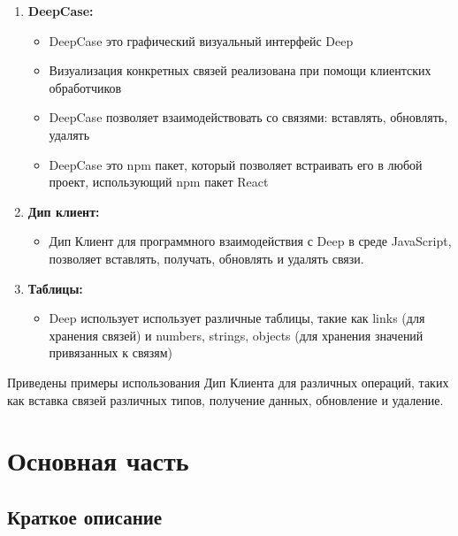 \documentclass{article}
\begin{document}
\begin{enumerate}
  \item \textbf{DeepCase:}
        \begin{itemize}
          \item DeepCase это графический визуальный интерфейс Deep
          \item Визуализация конкретных связей реализована при помощи клиентских обработчиков
          \item DeepCase позволяет взаимодействовать со связями: вставлять,
                обновлять, удалять
          \item DeepCase это npm пакет, который позволяет встраивать его в любой проект, использующий npm пакет React
        \end{itemize}

  \item \textbf{Дип клиент:}
        \begin{itemize}
          \item Дип Клиент для программного взаимодействия с Deep в среде
                JavaScript, позволяет вставлять, получать, обновлять и удалять
                связи.
        \end{itemize}

  \item \textbf{Таблицы:}
        \begin{itemize}
          \item Deep использует использует различные таблицы, такие как links (для хранения связей) и numbers, strings, objects (для хранения значений привязанных к связям)
        \end{itemize}
\end{enumerate}

Приведены примеры использования Дип Клиента для различных операций, таких как
вставка связей различных типов, получение данных, обновление и удаление.


\tableofcontents

\section{Основная часть}

\subsection{Краткое описание}
\end{document}
